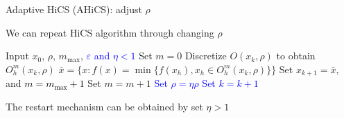 \documentclass{beamer}
\begin{document}
\begin{frame}{Adaptive HiCS (AHiCS): adjust $\rho$}

\begin{itemize}
\footnotesize{
	\item We can repeat HiCS algorithm through changing $\rho$
		}
\vspace{-0.2cm}
\begin{algorithm}[H]
\scriptsize{
	\caption{AHiCS}
	\label{alg:refined}
\begin{algorithmic}[1]
	\STATE Input $x_0$, $\rho$, $m_{\max}$,
	\textcolor{blue}{$\varepsilon$ and $\eta<1$}
	\IF { \textcolor{blue}{ $\rho>\varepsilon$}}
		\STATE Set $m=0$
			\STATE Discretize $O(x_k,\rho)$ to obtain $O^m_h(x_k,\rho)$
			\STATE $\bar{x} = \{x: f(x)=\min\{f(x_h), x_h\in O^m_h(x_k, \rho) \} \}$
				\STATE Set $x_{k+1}=\bar{x}$, 
				and \textcolor{black}{$m=m_{\max}+1$} 
			\ELSE
				\STATE Set $m = m+1$
			\ENDIF
		\ELSE
			\STATE \textcolor{blue}{ Set $\rho=\eta\rho$}
		\ENDIF
		\STATE \textcolor{blue}{Set $k=k+1$}
	\ENDFOR
\ENDIF
\end{algorithmic}
}
\end{algorithm}
\vspace{-0.3cm}
\footnotesize{
	\item The restart mechanism can be obtained by set $\eta>1$
		}
\end{itemize}
\end{frame}
\end{document}
